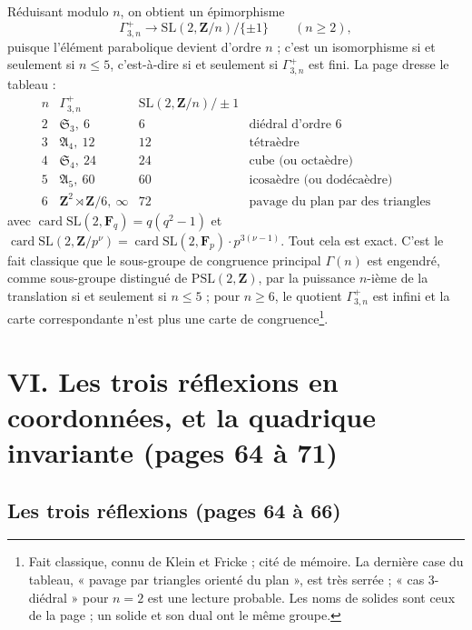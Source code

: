 \documentclass[11pt,a4paper]{article}
\begin{document}
Réduisant modulo $n$, on obtient un épimorphisme
\[
\Gamma^+_{3,n} \longrightarrow \mathrm{SL}(2, \mathbf{Z}/n) / \{\pm 1\} \qquad (n
\geq 2),
\]
puisque l'élément parabolique devient d'ordre $n$ ; c'est un isomorphisme si et
seulement si $n \leq 5$, c'est-à-dire si et seulement si $\Gamma^+_{3,n}$ est
fini. La page dresse le tableau :
\[
\begin{array}{c|c|c|l}
n & \Gamma^+_{3,n} & \mathrm{SL}(2, \mathbf{Z}/n)/\pm 1 & \\ \hline
2 & \mathfrak{S}_3,\ 6 & 6 & \text{diédral d'ordre } 6 \\
3 & \mathfrak{A}_4,\ 12 & 12 & \text{tétraèdre} \\
4 & \mathfrak{S}_4,\ 24 & 24 & \text{cube (ou octaèdre)} \\
5 & \mathfrak{A}_5,\ 60 & 60 & \text{icosaèdre (ou dodécaèdre)} \\
6 & \mathbf{Z}^2 \rtimes \mathbf{Z}/6,\ \infty & 72 & \text{pavage du plan par des triangles}
\end{array}
\]
avec $\operatorname{card}\mathrm{SL}(2, \mathbf{F}_q) = q(q^2 - 1)$ et
$\operatorname{card}\mathrm{SL}(2, \mathbf{Z}/p^\nu) = \operatorname{card}
\mathrm{SL}(2, \mathbf{F}_p)\cdot p^{3(\nu - 1)}$. Tout cela est exact. C'est le
fait classique que le sous-groupe de congruence principal $\Gamma(n)$ est
engendré, comme sous-groupe distingué de $\mathrm{PSL}(2, \mathbf{Z})$, par la
puissance $n$-ième de la translation si et seulement si $n \leq 5$ ; pour $n
\geq 6$, le quotient $\Gamma^+_{3,n}$ est infini et la carte correspondante
n'est plus une carte de congruence\footnote{Fait classique, connu de Klein et
Fricke ; cité de mémoire. La dernière case du tableau, « pavage par triangles
orienté du plan », est très serrée ; « cas 3-diédral » pour $n = 2$ est une
lecture probable. Les noms de solides sont ceux de la page ; un solide et son
dual ont le même groupe.}.

\section*{VI. Les trois réflexions en coordonnées, et la quadrique invariante (pages 64 à 71)}

\subsection*{Les trois réflexions (pages 64 à 66)}
\end{document}
